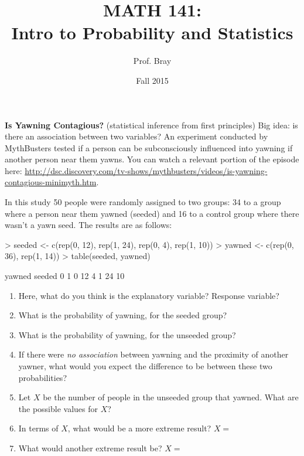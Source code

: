 \documentclass[10pt]{article}
\title{MATH 141:\\Intro to Probability and Statistics}
\author{Prof. Bray}
\date{Fall 2015}
\newcommand{\ans}{\vspace{0.25in}}
\begin{document}


\textbf{Is Yawning Contagious?} (statistical inference from first principles)  
Big idea: is there an association between two variables?  An experiment conducted by MythBusters tested if a person can be subconsciously influenced into yawning if another person near them yawns. You can watch a relevant portion of the episode here:  \url{http://dsc.discovery.com/tv-shows/mythbusters/videos/is-yawning-contagious-minimyth.htm}.

In this study 50 people were randomly assigned to two groups: 34 to a group where a person near them yawned (seeded) and 16 to a control group where there wasn't a yawn seed. The results are as follows:

\begin{Schunk}
\begin{Sinput}
> seeded <- c(rep(0, 12), rep(1, 24), rep(0, 4), rep(1, 10))
> yawned <- c(rep(0, 36), rep(1, 14))
> table(seeded, yawned)
\end{Sinput}
\begin{Soutput}
      yawned
seeded  0  1
     0 12  4
     1 24 10
\end{Soutput}
\end{Schunk}


\begin{enumerate}
  \item Here, what do you think is the explanatory variable?  Response variable? 
  \ans
  \item What is the probability of yawning, for the seeded group?
  \ans
  \item What is the probability of yawning, for the unseeded group?
  \ans
  \item If there were \emph{no association} between yawning and the proximity of another yawner, what would you expect the difference to be between these two probabilities?
  \ans
  \item Let $X$ be the number of people in the unseeded group that yawned.  What are the possible values for $X$?
  \ans
  \item In terms of $X$, what would be a more extreme result?  $X = $
  \ans
  \item What would another extreme result be?  $X = $
\end{enumerate}

\newpage
\end{document}
